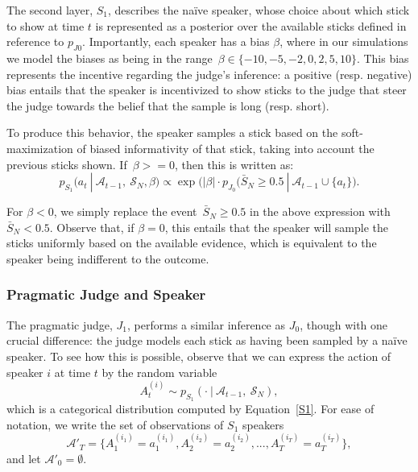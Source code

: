 \documentclass[10pt,letterpaper]{article}
\begin{document}
The second layer, $S_1$, describes the na\"ive speaker, whose choice about which stick to show
at time $t$ is represented as a posterior over the available sticks defined in reference to $p_{J0}$.
Importantly, each speaker has a bias $\beta$, where in our simulations we model the biases as being
in the range~${\beta \in \{-10, -5, -2, 0, 2, 5, 10\}}$. This bias represents the incentive regarding the judge's
inference: a positive (resp. negative) bias entails that the speaker is incentivized to show sticks to the judge
that steer the judge towards the belief that the sample is long (resp. short).

To produce this behavior, the speaker samples a stick based on the soft-maximization of biased informativity
of that stick, taking into account the previous sticks shown. If~${\beta>=0}$, then this is written as:
\begin{equation}\label{S1}
p_{S_1} (a_t \ | \ \mathcal{A}_{t-1},\ \mathcal{S}_N, \beta) \propto \exp \bigl(\lvert\beta\rvert \cdot p_{J_0} (\bar{S}_N \ge 0.5 \ | \ \mathcal{A}_{t-1} \cup \{a_t\} \bigr).
\end{equation}

For $\beta<0$, we simply replace the event~${\bar{S}_N \ge 0.5}$ in the above expression with~${\bar{S}_N < 0.5}$.
Observe that, if $\beta = 0$, this entails that the speaker will sample the sticks uniformly based on the available
evidence, which is equivalent to the speaker being indifferent to the outcome.

\subsubsection{Pragmatic Judge and Speaker}
The pragmatic judge, $J_1$, performs a similar inference as $J_0$, though with one crucial difference: the judge
models each stick as having been sampled by a na\"ive speaker. To see how this is possible, observe that we can express
the action of speaker $i$ at time $t$ by the random variable 
\begin{equation}
	A_t^{(i)} \sim p_{S_1} (\cdot \ | \ \mathcal{A}_{t-1},\ \mathcal{S}_N),
\end{equation}
which is a categorical distribution computed by Equation~\ref{S1}. For ease of notation, we write the set
of observations of $S_1$ speakers
\begin{equation}
	\mathcal{A}'_T = \{ A_1^{(i_1)}=a_1^{(i_1)}, A_2^{(i_2)}=a_2^{(i_2)}, ..., A_T^{(i_T)}=a_T^{(i_T)}\}, 
\end{equation}
and let $\mathcal{A}'_0 = \emptyset$.
\end{document}

